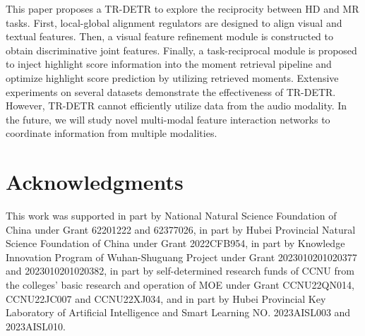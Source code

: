 This paper proposes a TR-DETR to explore the reciprocity between HD and MR tasks.
First, local-global alignment regulators are designed to align visual and textual features. Then, a visual feature refinement module is constructed to obtain discriminative joint features. Finally, a task-reciprocal module is proposed to inject highlight score information into the moment retrieval pipeline and optimize highlight score prediction by utilizing retrieved moments.  Extensive experiments on several datasets demonstrate the effectiveness of TR-DETR.
However, TR-DETR cannot efficiently utilize data from the audio modality. In the future, we will study novel multi-modal feature interaction networks to coordinate information from multiple modalities.

\section{Acknowledgments}
This work was supported in part by National Natural Science Foundation of China under Grant 62201222 and 62377026, in part by Hubei Provincial Natural Science Foundation of China under Grant 2022CFB954, in part by Knowledge Innovation Program of Wuhan-Shuguang Project under Grant 2023010201020377 and 2023010201020382, in part by self-determined research funds of CCNU from the colleges' basic research and operation of MOE under Grant CCNU22QN014, CCNU22JC007 and CCNU22XJ034, and in part by Hubei Provincial Key Laboratory of Artificial Intelligence and Smart Learning NO. 2023AISL003 and 2023AISL010.

